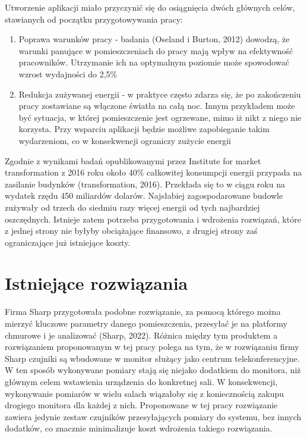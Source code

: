 \documentclass[11pt]{article} %
\begin{document}
Utworzenie aplikacji miało przyczynić się do osiągnięcia dwóch głównych 
celów, stawianych od początku przygotowywania pracy:

\begin{enumerate} %
    \item Poprawa warunków pracy - badania (Oseland i Burton, 2012) dowodzą, że 
    warunki panujące w pomieszczeniach do pracy mają wpływ na efektywność pracowników. 
    Utrzymanie ich na optymalnym poziomie może spowodować wzrost wydajności do 2,5\%
    \item Redukcja zużywanej energii - w praktyce często zdarza się, że po zakończeniu 
    pracy zostawiane są włączone światła na całą noc. Innym przykładem może być 
    sytuacja, w której pomieszczenie jest ogrzewane, mimo iż nikt z niego nie korzysta. 
    Przy wsparciu aplikacji będzie możliwe zapobieganie takim wydarzeniom, co w 
    konsekwencji ograniczy zużycie energii
\end{enumerate}

Zgodnie z wynikami badań opublikowanymi przez Institute for market transformation z 
2016 roku około 40\% całkowitej konsumpcji energii przypada na zasilanie budynków 
(transformation, 2016). Przekłada się to w ciągu roku na wydatek rzędu 450 miliardów 
dolarów. Najsłabiej zagospodarowane budowle zużywały od trzech do siedmiu razy więcej 
energii od tych najbardziej oszczędnych. Istnieje zatem potrzeba przygotowania 
i wdrożenia rozwiązań, które z jednej strony nie byłyby obciążające finansowo, z 
drugiej strony zaś ograniczające już istniejące koszty. 

\section{Istniejące rozwiązania}
Firma Sharp przygotowała podobne rozwiązanie, za pomocą którego można mierzyć kluczowe 
parametry danego pomieszczenia, przesyłać je na platformy chmurowe i je analizować 
(Sharp, 2022). Różnica między tym produktem a rozwiązaniem proponowanym w tej pracy 
polega na tym, że w rozwiązaniu firmy Sharp czujniki są wbudowane w monitor służący 
jako centrum telekonferencyjne. W ten sposób wykonywane pomiary stają się niejako 
dodatkiem do monitora, niż głównym celem wstawienia urządzenia do konkretnej sali. 
W konsekwencji, wykonywanie pomiarów w wielu salach wiązałoby się z koniecznością 
zakupu drogiego monitora dla każdej z nich. Proponowane w tej pracy rozwiązanie zawiera 
jedynie zestaw czujników przesyłających pomiary do systemu, bez innych dodatków, co 
znacznie minimalizuje koszt wdrożenia takiego rozwiązania.
\end{document}
